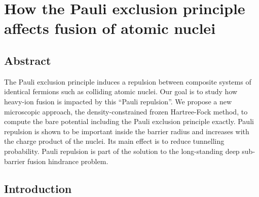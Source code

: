 
\chapter{How the Pauli exclusion principle affects fusion of atomic nuclei}\label{chapters:chapter_3}
\vspace{-7mm}

\author{C. Simenel}

\author{A.S. Umar}

\author{K. Godbey}

\author{M. Dasgupta}

\author{D. J. Hinde}


\section*{Abstract}
	The Pauli exclusion principle induces a repulsion between composite systems 
	of identical fermions such as colliding atomic nuclei.
	Our goal is to study how heavy-ion fusion is impacted by this ``Pauli repulsion''.
	We propose a new microscopic approach, the density-constrained frozen Hartree-Fock method, 
	to compute the bare potential including the Pauli exclusion principle exactly.
	Pauli repulsion is shown to be important inside the barrier radius and increases 
	with the charge product of the nuclei. 
	Its main effect is to reduce tunnelling probability. 
	Pauli repulsion is part of the solution to the long-standing deep sub-barrier fusion hindrance problem.

\section{Introduction}

